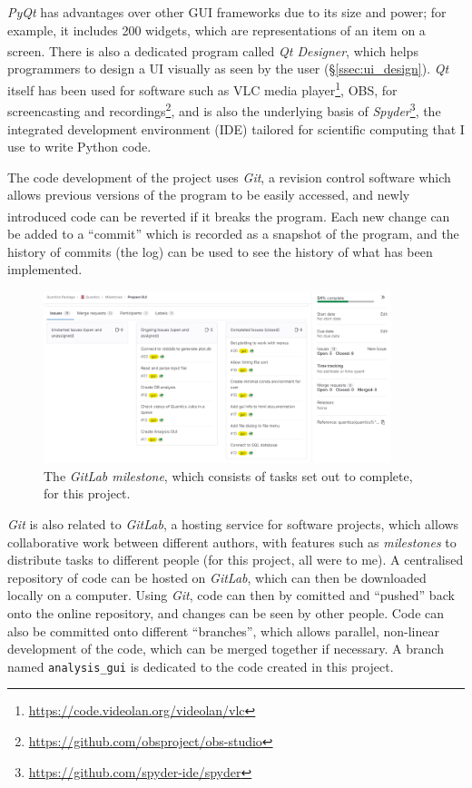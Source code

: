 \documentclass[12pt]{article}
\begin{document}
\textit{PyQt} has advantages over other GUI frameworks due to its size and power; for example, it includes 200 widgets, which are representations of an item on a screen.\textsuperscript{\cite{pyqt}} There is also a dedicated program called \textit{Qt Designer}, which helps programmers to design a UI visually as seen by the user (\S\ref{ssec:ui_design}). \textit{Qt} itself has been used for software such as VLC media player\footnote{\url{https://code.videolan.org/videolan/vlc}}, OBS, for screencasting and recordings\footnote{\url{https://github.com/obsproject/obs-studio}}, and is also the underlying basis of \textit{Spyder}\footnote{\url{https://github.com/spyder-ide/spyder}}, the integrated development environment (IDE) tailored for scientific computing that I use to write Python code.

The code development of the project uses \textit{Git}, a revision control software which allows previous versions of the program to be easily accessed, and newly introduced code can be reverted if it breaks the program.\textsuperscript{\cite{git}} Each new change can be added to a ``commit'' which is recorded as a snapshot of the program, and the history of commits (the log) can be used to see the history of what has been implemented.

\begin{figure}[h]
    \centering
    \includegraphics[width=0.9\textwidth]{img/gitlab.png}
    \caption{The \textit{GitLab milestone}, which consists of tasks set out to complete, for this project.}
    \label{fig:gitlab}
\end{figure}

\textit{Git} is also related to \textit{GitLab}, a hosting service for software projects, which allows collaborative work between different authors, with features such as \textit{milestones} to distribute tasks to different people (for this project, all were to me). A centralised repository of code can be hosted on \textit{GitLab}, which can then be downloaded locally on a computer. Using \textit{Git}, code can then by comitted and ``pushed'' back onto the online repository, and changes can be seen by other people. Code can also be committed onto different ``branches'', which allows parallel, non-linear development of the code, which can be merged together if necessary. A branch named \texttt{analysis\_gui} is dedicated to the code created in this project.
\end{document}
